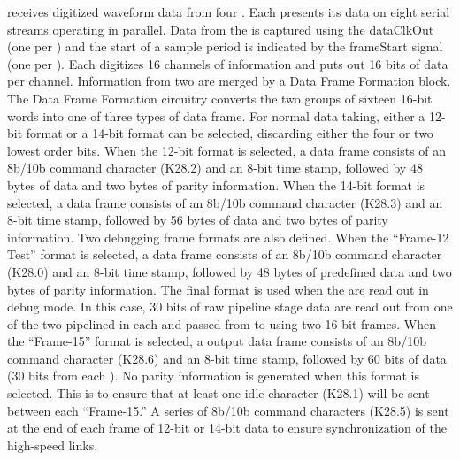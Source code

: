  receives digitized waveform data from 
four  . Each  presents its data on eight 
serial streams operating in parallel. Data from the  is captured 
using the  dataClkOut 
(one per ) and the start of a 
sample period is indicated by the frameStart signal (one per ). 
Each  digitizes \num{16} channels of information and puts out \num{16} bits 
of data per channel. Information from two  are merged by a Data 
Frame Formation block.   
The Data Frame Formation circuitry converts the two 
groups of sixteen \num{16}-bit words into one of three types of data frame. For normal 
data taking, either a \num{12}-bit format or a \num{14}-bit  format can be 
selected, discarding either the four or two lowest order bits. When the 
\num{12}-bit format is selected, a data frame consists of an 8b/10b command 
character (K28.2) and an \num{8}-bit time stamp, followed by \num{48} bytes of  
data and two bytes of parity information. When the \num{14}-bit format is selected, 
a data frame consists of an 8b/10b command character (K28.3) and an \num{8}-bit time 
stamp, followed by \num{56} bytes of  data and two bytes of parity 
information. Two debugging frame formats are also defined. When the ``Frame-12 Test'' 
format is selected, a data frame consists of an 8b/10b command character 
(K28.0) and an \num{8}-bit time stamp, followed by \num{48} bytes of predefined data 
and two bytes of parity information. The final format is used when the 
 are read out in debug mode. In this case, \num{30} bits of raw 
pipeline stage data are read out from one of the two pipelined  
in each   and passed from  to 
 using two \num{16}-bit frames. When the ``Frame-15'' format is 
selected, a  output data frame consists of an 8b/10b command 
character (K28.6) and an \num{8}-bit time stamp, followed by \num{60} bits of  
data (\num{30} bits from each ). No parity information is generated 
when this format is selected. This is to ensure that at least one idle 
character (K28.1) will be sent between each ``Frame-15.'' A series of 8b/10b 
command characters (K28.5) is sent at the end of each frame of \num{12}-bit or 
\num{14}-bit data to ensure synchronization of the high-speed links.

